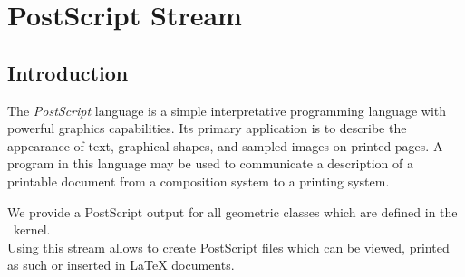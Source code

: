 \chapter{PostScript Stream} \label{Chapter_PostScript}

\section{Introduction}


The {\em PostScript} language is a simple interpretative programming
language with powerful graphics capabilities. Its primary application
is to describe the appearance of text, graphical shapes, and sampled
images on printed pages. A program in this language may be used to
communicate a description of a printable document from a composition
system to a printing system.

 We provide a PostScript output for all geometric
classes which are defined in the \cgal\ kernel.\\
Using this stream allows to create PostScript files which can be viewed,
printed as such or inserted in LaTeX documents.


